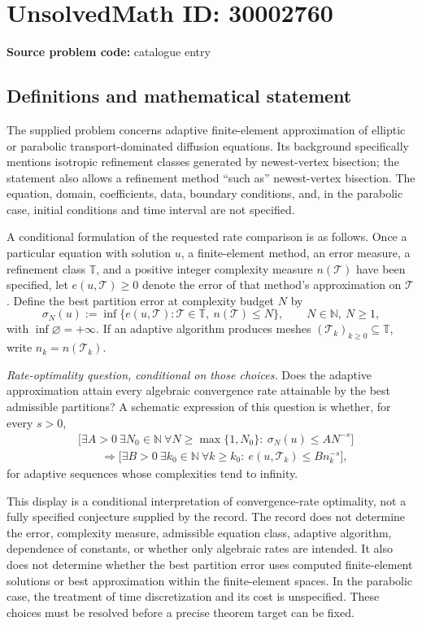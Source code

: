 \documentclass[11pt]{article}
\newcommand{\N}{\mathbb{N}}
\begin{document}
\section*{UnsolvedMath ID: 30002760}
\textbf{Source problem code:} catalogue entry
\subsection{Definitions and mathematical statement}
The supplied problem concerns adaptive finite-element approximation of elliptic or parabolic transport-dominated diffusion equations. Its background specifically mentions isotropic refinement classes generated by newest-vertex bisection; the statement also allows a refinement method ``such as'' newest-vertex bisection. The equation, domain, coefficients, data, boundary conditions, and, in the parabolic case, initial conditions and time interval are not specified.

A conditional formulation of the requested rate comparison is as follows. Once a particular equation with solution \(u\), a finite-element method, an error measure, a refinement class \(\mathbb T\), and a positive integer complexity measure \(n(\mathcal T)\) have been specified, let \(e(u,\mathcal T)\geq 0\) denote the error of that method's approximation on \(\mathcal T\). Define the best partition error at complexity budget \(N\) by
\[
\sigma_N(u):=\inf\bigl\{e(u,\mathcal T):\mathcal T\in\mathbb T,\ n(\mathcal T)\leq N\bigr\},\qquad N\in\N,\ N\geq1,
\]
with \(\inf\varnothing=+\infty\). If an adaptive algorithm produces meshes \((\mathcal T_k)_{k\geq0}\subseteq\mathbb T\), write \(n_k=n(\mathcal T_k)\).

\emph{Rate-optimality question, conditional on those choices.} Does the adaptive approximation attain every algebraic convergence rate attainable by the best admissible partitions? A schematic expression of this question is whether, for every \(s>0\),
\[
\begin{aligned}
&\bigl[\exists A>0\ \exists N_0\in\N\ \forall N\geq\max\{1,N_0\}:\ \sigma_N(u)\leq A N^{-s}\bigr]\\
&\qquad\Longrightarrow
\bigl[\exists B>0\ \exists k_0\in\N\ \forall k\geq k_0:\ e(u,\mathcal T_k)\leq B n_k^{-s}\bigr],
\end{aligned}
\]
for adaptive sequences whose complexities tend to infinity.

This display is a conditional interpretation of convergence-rate optimality, not a fully specified conjecture supplied by the record. The record does not determine the error, complexity measure, admissible equation class, adaptive algorithm, dependence of constants, or whether only algebraic rates are intended. It also does not determine whether the best partition error uses computed finite-element solutions or best approximation within the finite-element spaces. In the parabolic case, the treatment of time discretization and its cost is unspecified. These choices must be resolved before a precise theorem target can be fixed.
\end{document}
